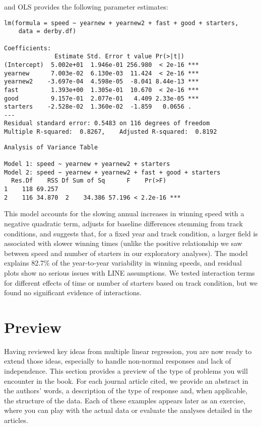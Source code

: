 \documentclass[
]{krantz}
\begin{document}
and OLS provides the following parameter estimates:

\begin{verbatim}
lm(formula = speed ~ yearnew + yearnew2 + fast + good + starters, 
    data = derby.df)

Coefficients:
              Estimate Std. Error t value Pr(>|t|)    
(Intercept)  5.002e+01  1.946e-01 256.980  < 2e-16 ***
yearnew      7.003e-02  6.130e-03  11.424  < 2e-16 ***
yearnew2    -3.697e-04  4.598e-05  -8.041 8.44e-13 ***
fast         1.393e+00  1.305e-01  10.670  < 2e-16 ***
good         9.157e-01  2.077e-01   4.409 2.33e-05 ***
starters    -2.528e-02  1.360e-02  -1.859   0.0656 .  
---
Residual standard error: 0.5483 on 116 degrees of freedom
Multiple R-squared:  0.8267,    Adjusted R-squared:  0.8192 
\end{verbatim}

\begin{verbatim}
Analysis of Variance Table

Model 1: speed ~ yearnew + yearnew2 + starters
Model 2: speed ~ yearnew + yearnew2 + fast + good + starters
  Res.Df    RSS Df Sum of Sq      F    Pr(>F)    
1    118 69.257                                  
2    116 34.870  2    34.386 57.196 < 2.2e-16 ***
\end{verbatim}

This model accounts for the slowing annual increases in winning speed with a negative quadratic term, adjusts for baseline differences stemming from track conditions, and suggests that, for a fixed year and track condition, a larger field is associated with slower winning times (unlike the positive relationship we saw between speed and number of starters in our exploratory analyses). The model explains 82.7\% of the year-to-year variability in winning speeds, and residual plots show no serious issues with LINE assumptions. We tested interaction terms for different effects of time or number of starters based on track condition, but we found no significant evidence of interactions.

\hypertarget{preview}{%
\section{Preview}\label{preview}}

Having reviewed key ideas from multiple linear regression, you are now ready to extend those ideas, especially to handle non-normal responses and lack of independence. This section provides a preview of the type of problems you will encounter in the book. For each journal article cited, we provide an abstract in the authors' words, a description of the type of response and, when applicable, the structure of the data. Each of these examples appears later as an exercise, where you can play with the actual data or evaluate the analyses detailed in the articles.
\end{document}
